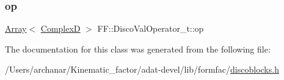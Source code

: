 \subsubsection{\texorpdfstring{op}{op}}
{\footnotesize\ttfamily \mbox{\hyperlink{classXMLArray_1_1Array}{Array}}$<$ \mbox{\hyperlink{group__defs_gaf38ee8c84f090ee0c3b76e7a384fb316}{ComplexD}} $>$ F\+F\+::\+Disco\+Val\+Operator\+\_\+t\+::op}



The documentation for this class was generated from the following file\+:\begin{DoxyCompactItemize}
\item 
/\+Users/archanar/\+Kinematic\+\_\+factor/adat-\/devel/lib/formfac/\mbox{\hyperlink{adat-devel_2lib_2formfac_2discoblocks_8h}{discoblocks.\+h}}\end{DoxyCompactItemize}

